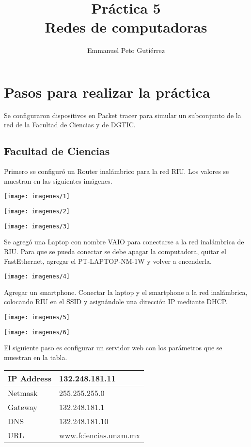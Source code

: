 \documentclass{article}
\title{Práctica 5\\Redes de computadoras}
\author{Emmanuel Peto Gutiérrez}
\begin{document}
\maketitle

\section{Pasos para realizar la práctica}

Se configuraron dispositivos en Packet tracer para simular un subconjunto de la red de la Facultad de Ciencias y de DGTIC.

\subsection{Facultad de Ciencias}

Primero se configuró un Router inalámbrico para la red RIU. Los valores se muestran en las siguientes imágenes.

\begin{center}
\texttt{[image: imagenes/1]}

\texttt{[image: imagenes/2]}

\texttt{[image: imagenes/3]}
\end{center}

Se agregó una Laptop con nombre VAIO para conectarse a la red inalámbrica de RIU. Para que se pueda conectar se debe apagar la computadora, quitar el FastEthernet, agregar el PT-LAPTOP-NM-1W y volver a encenderla.

\begin{center}
\texttt{[image: imagenes/4]}
\end{center}

Agregar un smartphone. Conectar la laptop y el smartphone a la red inalámbrica, colocando RIU en el SSID y asignándole una dirección IP mediante DHCP.

\begin{center}
\texttt{[image: imagenes/5]}

\texttt{[image: imagenes/6]}
\end{center}

El siguiente paso es configurar un servidor web con los parámetros que se muestran en la tabla.

\begin{center}
\begin{tabular}{|l|l|}
\hline
IP Address & 132.248.181.11 \\ \hline
Netmask & 255.255.255.0 \\ \hline
Gateway & 132.248.181.1 \\ \hline
DNS & 132.248.181.10 \\ \hline
URL & www.fciencias.unam.mx \\ \hline
\end{tabular}
\end{center}
\end{document}
